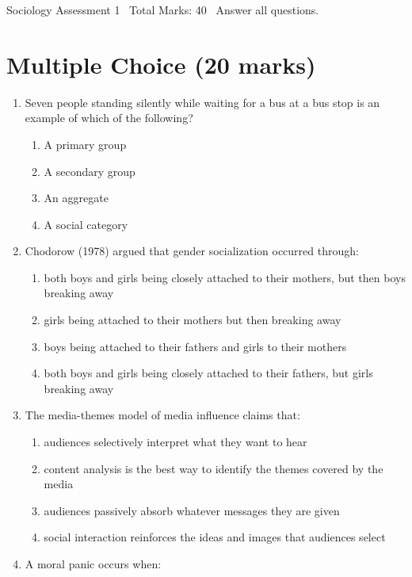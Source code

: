 \documentclass[12pt]{article}
\begin{document}
\begin{center}
Sociology Assessment 1 \
Total Marks: 40 \
Answer all questions.
\end{center}

\section*{Multiple Choice (20 marks)}
\begin{enumerate}[label=\arabic*.]
\item Seven people standing silently while waiting for a bus at a bus stop is an example of which of the following?
\begin{enumerate}[label=(\alph*)]
    \item A primary group
    \item A secondary group
    \item An aggregate
    \item A social category
\end{enumerate}
\item Chodorow (1978) argued that gender socialization occurred through:
\begin{enumerate}[label=(\alph*)]
    \item both boys and girls being closely attached to their mothers, but then boys breaking away
    \item girls being attached to their mothers but then breaking away
    \item boys being attached to their fathers and girls to their mothers
    \item both boys and girls being closely attached to their fathers, but girls breaking away
\end{enumerate}
\item The media-themes model of media influence claims that:
\begin{enumerate}[label=(\alph*)]
    \item audiences selectively interpret what they want to hear
    \item content analysis is the best way to identify the themes covered by the media
    \item audiences passively absorb whatever messages they are given
    \item social interaction reinforces the ideas and images that audiences select
\end{enumerate}
\item A moral panic occurs when:
\begin{enumerate}[label=(\alph*)]

\end{enumerate}
\end{enumerate}
\end{document}
